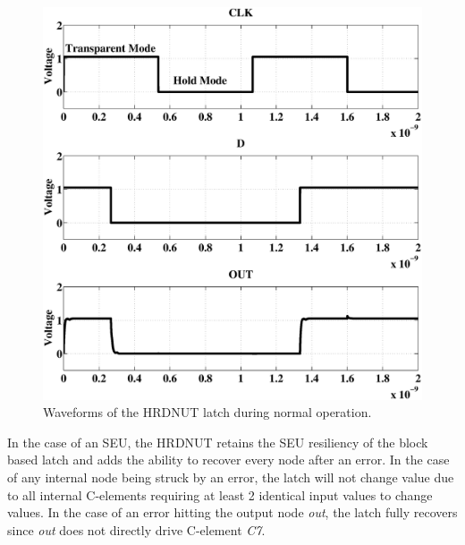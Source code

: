 \begin{figure}[!htbp]
	\centering
	\includegraphics[width=0.80\linewidth]{Figures/defaultoperation.eps}
	\caption{Waveforms of the HRDNUT latch during normal operation.}
	\label{NormOp}
\end{figure}

In the case of an SEU, the HRDNUT retains the SEU resiliency of the block based latch and adds the ability to recover every node after an error. In the case of any internal node being struck by an error, the latch will not change value due to all internal C-elements requiring at least 2 identical input values to change values. In the case of an error hitting the output node \textit{out}, the latch fully recovers since \textit{out} does not directly drive C-element \textit{C7}.


